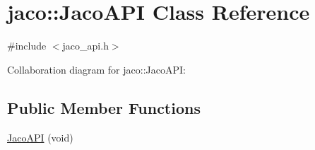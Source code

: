 \hypertarget{classjaco_1_1_jaco_a_p_i}{}\section{jaco\+:\+:Jaco\+A\+PI Class Reference}
\label{classjaco_1_1_jaco_a_p_i}


{\ttfamily \#include $<$jaco\+\_\+api.\+h$>$}



Collaboration diagram for jaco\+:\+:Jaco\+A\+PI\+:
\subsection*{Public Member Functions}
\begin{DoxyCompactItemize}
\item 
\hyperlink{classjaco_1_1_jaco_a_p_i_ac9bb26a48274e51c96d460f74372ccd0}{Jaco\+A\+PI} (void)
\end{DoxyCompactItemize}
